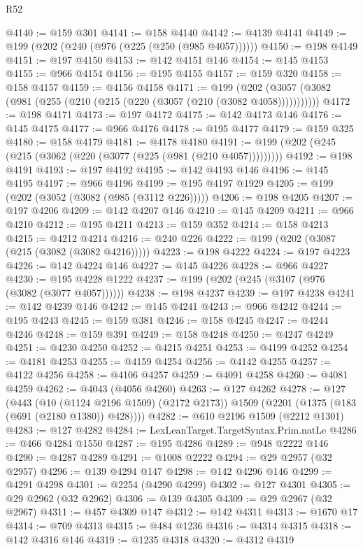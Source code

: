 \begin{lexlean}{R52}
\begin{coremodule}
@4140 := @159 @301
@4141 := @158 @4140
@4142 := @4139 @4141
@4149 := @199 (@202 (@240 (@976 (@225 (@250 (@985 @4057))))))
@4150 := @198 @4149
@4151 := @197 @4150
@4153 := @142 @4151 @146
@4154 := @145 @4153
@4155 := @966 @4154
@4156 := @195 @4155
@4157 := @159 @320
@4158 := @158 @4157
@4159 := @4156 @4158
@4171 := @199 (@202 (@3057 (@3082 (@981 (@255 (@210 (@215 (@220 (@3057 (@210 (@3082 @4058)))))))))))
@4172 := @198 @4171
@4173 := @197 @4172
@4175 := @142 @4173 @146
@4176 := @145 @4175
@4177 := @966 @4176
@4178 := @195 @4177
@4179 := @159 @325
@4180 := @158 @4179
@4181 := @4178 @4180
@4191 := @199 (@202 (@245 (@215 (@3062 (@220 (@3077 (@225 (@981 (@210 @4057)))))))))
@4192 := @198 @4191
@4193 := @197 @4192
@4195 := @142 @4193 @146
@4196 := @145 @4195
@4197 := @966 @4196
@4199 := @195 @4197 @1929
@4205 := @199 (@202 (@3052 (@3082 (@985 (@3112 @226)))))
@4206 := @198 @4205
@4207 := @197 @4206
@4209 := @142 @4207 @146
@4210 := @145 @4209
@4211 := @966 @4210
@4212 := @195 @4211
@4213 := @159 @352
@4214 := @158 @4213
@4215 := @4212 @4214
@4216 := @240 @226
@4222 := @199 (@202 (@3087 (@215 (@3082 (@3082 @4216)))))
@4223 := @198 @4222
@4224 := @197 @4223
@4226 := @142 @4224 @146
@4227 := @145 @4226
@4228 := @966 @4227
@4230 := @195 @4228 @1222
@4237 := @199 (@202 (@245 (@3107 (@976 (@3082 (@3077 @4057))))))
@4238 := @198 @4237
@4239 := @197 @4238
@4241 := @142 @4239 @146
@4242 := @145 @4241
@4243 := @966 @4242
@4244 := @195 @4243
@4245 := @159 @381
@4246 := @158 @4245
@4247 := @4244 @4246
@4248 := @159 @391
@4249 := @158 @4248
@4250 := @4247 @4249
@4251 := @4230 @4250
@4252 := @4215 @4251
@4253 := @4199 @4252
@4254 := @4181 @4253
@4255 := @4159 @4254
@4256 := @4142 @4255
@4257 := @4122 @4256
@4258 := @4106 @4257
@4259 := @4091 @4258
@4260 := @4081 @4259
@4262 := @4043 (@4056 @4260)
@4263 := @127 @4262
@4278 := @127
    (@443
      (@10 (@1124 @2196 @1509) (@2172 @2173))
      @1509
      (@2201 (@1375 (@183 (@691 (@2180 @1380)) @428))))
@4282 := @610 @2196 @1509 (@2212 @1301)
@4283 := @127 @4282
@4284 := LexLeanTarget.TargetSyntax.Prim.natLe
@4286 := @466 @4284 @1550
@4287 := @195 @4286
@4289 := @948 @2222 @146
@4290 := @4287 @4289
@4291 := @1008 @2222
@4294 := @29 @2957 (@32 @2957)
@4296 := @139 @4294 @147
@4298 := @142 @4296 @146
@4299 := @4291 @4298
@4301 := @2254 (@4290 @4299)
@4302 := @127 @4301
@4305 := @29 @2962 (@32 @2962)
@4306 := @139 @4305
@4309 := @29 @2967 (@32 @2967)
@4311 := @457 @4309 @147
@4312 := @142 @4311
@4313 := @1670 @17
@4314 := @709 @4313
@4315 := @484 @1236
@4316 := @4314 @4315
@4318 := @142 @4316 @146
@4319 := @1235 @4318
@4320 := @4312 @4319

\end{coremodule}
\end{lexlean}
